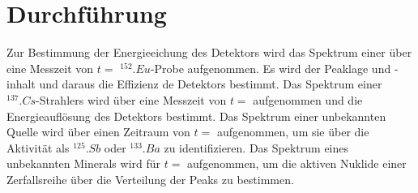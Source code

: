 \section{Durchführung}
\label{sec:Durchführung}

Zur Bestimmung der Energieeichung des Detektors wird das Spektrum einer über eine Messzeit von $t=$ $^{152}.{Eu}$-Probe aufgenommen.
Es wird der Peaklage und -inhalt und daraus die Effizienz de Detektors bestimmt.
Das Spektrum einer $^{137}.{Cs}$-Strahlers wird über eine Messzeit von $t=$ aufgenommen und die Energieauflösung des Detektors bestimmt.
Das Spektrum einer unbekannten Quelle wird über einen Zeitraum von $t=$ aufgenommen, um sie über die Aktivität als $^{125}.{Sb}$ oder $^{133}.{Ba}$ zu identifizieren.
Das Spektrum eines unbekannten Minerals wird für $t= $ aufgenommen, um die aktiven Nuklide einer Zerfallsreihe über die Verteilung der Peaks zu bestimmen.


